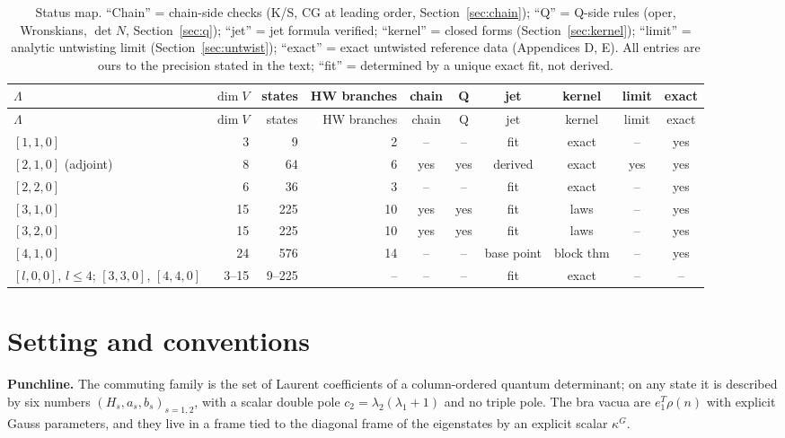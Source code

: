 \documentclass[11pt]{article}
\begin{document}
{\scriptsize
\begin{longtable}{lrrrcccccc}
\caption{Status map.
``Chain'' = chain-side checks (K/S, CG at leading order, Section~\ref{sec:chain}); ``Q'' = Q-side rules (oper, Wronskians, $\det N$, Section~\ref{sec:q}); ``jet'' = jet formula verified; ``kernel'' = closed forms (Section~\ref{sec:kernel}); ``limit'' = analytic untwisting limit (Section~\ref{sec:untwist}); ``exact'' = exact untwisted reference data (Appendices D, E).
All entries are ours to the precision stated in the text; ``fit'' = determined by a unique exact fit, not derived.}\label{tab:status}\\
\toprule
$\Lambda$ & $\dim V$ & states & HW branches & chain & Q & jet & kernel & limit & exact \\
\midrule
\endfirsthead
\toprule
$\Lambda$ & $\dim V$ & states & HW branches & chain & Q & jet & kernel & limit & exact \\
\midrule
\endhead
\bottomrule
\endlastfoot
$[1,1,0]$ & 3 & 9 & 2 & -- & -- & fit & exact & -- & yes \\
$[2,1,0]$ (adjoint) & 8 & 64 & 6 & yes & yes & derived & exact & yes & yes \\
$[2,2,0]$ & 6 & 36 & 3 & -- & -- & fit & exact & -- & yes \\
$[3,1,0]$ & 15 & 225 & 10 & yes & yes & fit & laws & -- & yes \\
$[3,2,0]$ & 15 & 225 & 10 & yes & yes & fit & laws & -- & yes \\
$[4,1,0]$ & 24 & 576 & 14 & -- & -- & base point & block thm & -- & yes \\
$[l,0,0]$, $l\le4$; $[3,3,0]$, $[4,4,0]$ & 3--15 & 9--225 & -- & -- & -- & fit & exact & -- & -- \\
\end{longtable}}


\section{Setting and conventions}\label{sec:setting}

\textbf{Punchline.} The commuting family is the set of Laurent coefficients of a column-ordered quantum determinant; on any state it is described by six numbers $(H_s,a_s,b_s)_{s=1,2}$, with a scalar double pole $c_2=\lambda_2(\lambda_1+1)$ and no triple pole.
The bra vacua are $e_1^T\rho(n)$ with explicit Gauss parameters, and they live in a frame tied to the diagonal frame of the eigenstates by an explicit scalar $\kappa^G$.
\end{document}
